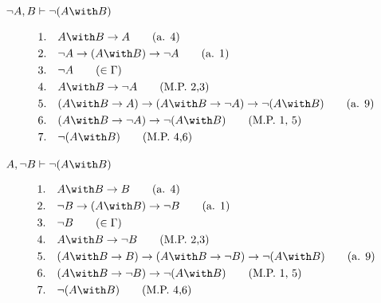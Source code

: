 \begin{exercise}[3.a]
    \(\neg A, B \vdash \neg(A \with B)\)

    \begin{align*}
        1.\quad & A \with B \to A \tag{a. 4}                                                   \\
        2.\quad & \neg A \to (A \with B) \to \neg A \tag{a. 1}                                 \\
        3.\quad & \neg A \tag{\(\in \Gamma\)}                                                  \\
        4.\quad & A \with B \to \neg A \tag{M.P. 2,3}                                          \\
        5.\quad & (A \with B \to A) \to (A \with B \to \neg A) \to \neg (A \with B) \tag{a. 9} \\
        6.\quad & (A \with B \to \neg A) \to \neg (A \with B) \tag{M.P. 1, 5}                  \\
        7.\quad & \neg (A \with B) \tag{M.P. 4,6}                                              \\
    \end{align*}
\end{exercise}

\begin{exercise}[3.b]
    \(A, \neg B \vdash \neg(A \with B)\)

    \begin{align*}
        1.\quad & A \with B \to B \tag{a. 4}                                                   \\
        2.\quad & \neg B \to (A \with B) \to \neg B \tag{a. 1}                                 \\
        3.\quad & \neg B \tag{\(\in \Gamma\)}                                                  \\
        4.\quad & A \with B \to \neg B \tag{M.P. 2,3}                                          \\
        5.\quad & (A \with B \to B) \to (A \with B \to \neg B) \to \neg (A \with B) \tag{a. 9} \\
        6.\quad & (A \with B \to \neg B) \to \neg (A \with B) \tag{M.P. 1, 5}                  \\
        7.\quad & \neg (A \with B) \tag{M.P. 4,6}                                              \\
    \end{align*}
\end{exercise}


